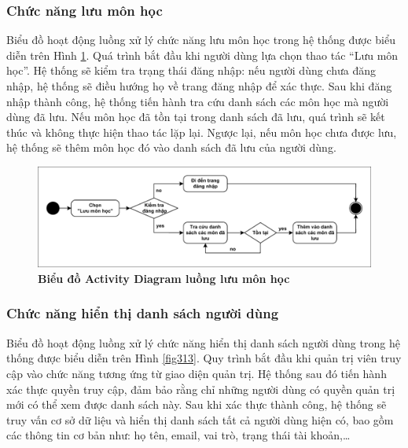 \documentclass{article}
\begin{document}
	\subsubsection{Chức năng lưu môn học}
	
	Biểu đồ hoạt động luồng xử lý chức năng lưu môn học trong hệ thống được biểu diễn trên Hình \ref{fig312}. Quá trình bắt đầu khi người dùng lựa chọn thao tác “Lưu môn học”. Hệ thống sẽ kiểm tra trạng thái đăng nhập: nếu người dùng chưa đăng nhập, hệ thống sẽ điều hướng họ về trang đăng nhập để xác thực. Sau khi đăng nhập thành công, hệ thống tiến hành tra cứu danh sách các môn học mà người dùng đã lưu. Nếu môn học đã tồn tại trong danh sách đã lưu, quá trình sẽ kết thúc và không thực hiện thao tác lặp lại. Ngược lại, nếu môn học chưa được lưu, hệ thống sẽ thêm môn học đó vào danh sách đã lưu của người dùng.
	
	\begin{figure}[!ht]
		\centering
		\includegraphics[trim= 10pt 10pt 10pt 10pt, clip, width=16cm]{activity_fig312.pdf}
		\caption [Biểu đồ Activity Diagram luồng lưu môn học]{\bfseries \fontsize{12pt}{0pt}\selectfont Biểu đồ Activity Diagram luồng lưu môn học}
		\label{fig312}
	\end{figure}
	
	\subsubsection{Chức năng hiển thị danh sách người dùng}
	
	Biểu đồ hoạt động luồng xử lý chức năng hiển thị danh sách người dùng trong hệ thống được biểu diễn trên Hình \ref{fig313}. Quy trình bắt đầu khi quản trị viên truy cập vào chức năng tương ứng từ giao diện quản trị. Hệ thống sau đó tiến hành xác thực quyền truy cập, đảm bảo rằng chỉ những người dùng có quyền quản trị mới có thể xem được danh sách này. Sau khi xác thực thành công, hệ thống sẽ truy vấn cơ sở dữ liệu và hiển thị danh sách tất cả người dùng hiện có, bao gồm các thông tin cơ bản như: họ tên, email, vai trò, trạng thái tài khoản,…
	
\end{document}
